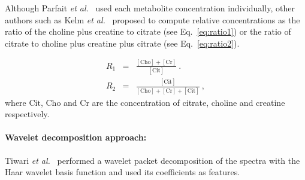 Although Parfait \textit{et al.}~\cite{Parfait2012} used each metabolite concentration individually, other authors such as Kelm \textit{et al.}~\cite{Kelm2007} proposed to compute relative concentrations as the ratio of the choline plus creatine to citrate (see Eq.~\eqref{eq:ratio1}) or the ratio of citrate to choline plus creatine plus citrate (see Eq.~\eqref{eq:ratio2}).

\begin{eqnarray}
	R_1 & = & \frac{ [ \text{Cho} ] + [ \text{Cr} ]}{[ \text{Cit} ]} \ . \label{eq:ratio1} \\
	R_2 & = & \frac{[ \text{Cit} ]}{[\text{Cho}]+[\text{Cr}]+[\text{Cit}]} \ , \label{eq:ratio2}
\end{eqnarray}
\noindent where $\text{Cit}$, $\text{Cho}$ and $\text{Cr}$ are the concentration of citrate, choline and creatine respectively.

\paragraph{Wavelet decomposition approach:} 
Tiwari \textit{et al.}~\cite{Tiwari2012} performed a wavelet packet decomposition \cite{Coifman1992} of the spectra with the Haar wavelet basis function and used its coefficients as features.
